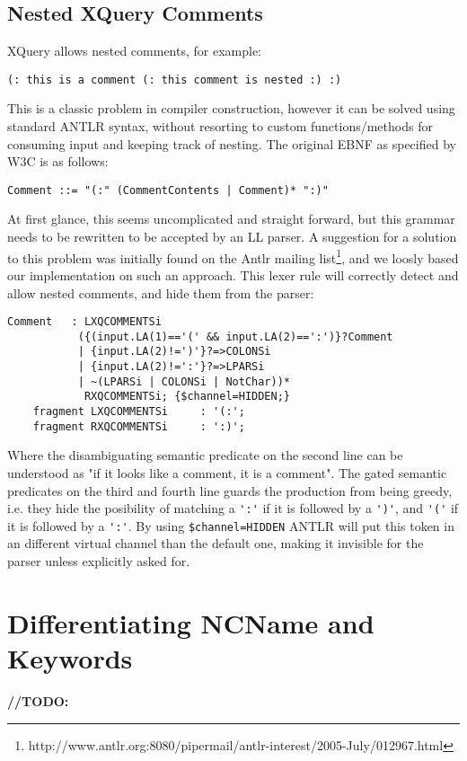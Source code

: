 \subsection{Nested XQuery Comments}
XQuery allows nested comments, for example:
\begin{verbatim}
(: this is a comment (: this comment is nested :) :)
\end{verbatim}
This is a classic problem in compiler construction, however it can be solved using standard ANTLR syntax, without resorting to custom functions/methods for consuming input and keeping track of nesting. The original EBNF as specified by W3C is as follows:
\begin{verbatim}
Comment ::= "(:" (CommentContents | Comment)* ":)"
\end{verbatim}
At first glance, this seems uncomplicated and straight forward, but this grammar needs to be rewritten to be accepted by an LL parser. A suggestion for a solution to this problem was initially found on the Antlr mailing list\footnote{http://www.antlr.org:8080/pipermail/antlr-interest/2005-July/012967.html}, and we loosly based our implementation on such an approach. This lexer rule will correctly detect and allow nested comments, and hide them from the parser:
\begin{verbatim}   
Comment   : LXQCOMMENTSi 
           ({(input.LA(1)=='(' && input.LA(2)==':')}?Comment 
           | {input.LA(2)!=')'}?=>COLONSi
           | {input.LA(2)!=':'}?=>LPARSi
           | ~(LPARSi | COLONSi | NotChar))*
            RXQCOMMENTSi; {$channel=HIDDEN;}
    fragment LXQCOMMENTSi     : '(:';
    fragment RXQCOMMENTSi     : ':)';
\end{verbatim}
Where the disambiguating semantic predicate on the second line can be understood as "if it looks like a comment, it is a comment". The gated semantic predicates on the third and fourth line guards the production from being greedy, i.e. they hide the posibility of matching a \verb!':'! if it is followed by a \verb!')'!, and \verb!'('! if it is followed by a \verb!':'!. By using \verb!$channel=HIDDEN! ANTLR will put this token in an different virtual channel than the default one, making it invisible for the parser unless explicitly asked for. 

\section{Differentiating NCName and Keywords}

\textbf{\LARGE //TODO:} 

